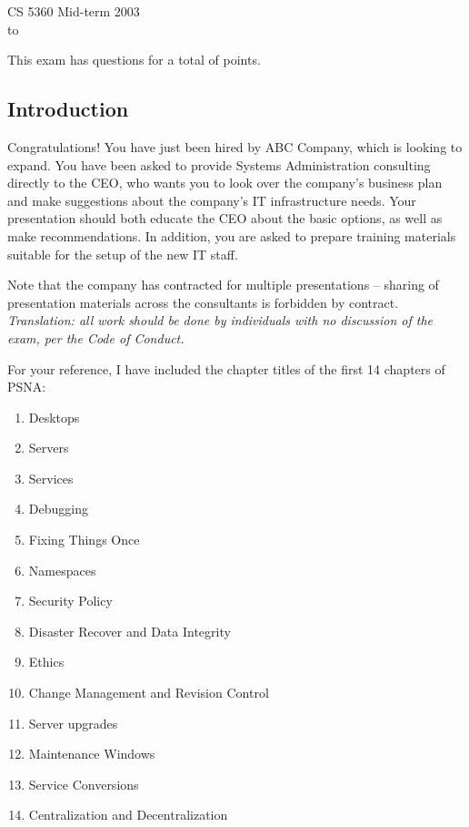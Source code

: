 \documentclass{exam}
\begin{document}
{\large CS 5360 Mid-term 2003}\\
\hbox to \textwidth{\large Name:\enspace\hrulefill}
\vspace{0.1in}

This exam has \numquestions{} questions for a total of \numpoints{} points.

\begin{questions}

\question[100]

\section*{Introduction}

Congratulations!  You have just been hired by ABC Company, which is looking
to expand.  You have been asked to provide Systems Administration
consulting directly to the CEO, who wants you to look over the company's
business plan and make suggestions about the company's IT infrastructure
needs.  Your presentation should both educate the CEO about the basic
options, as well as make recommendations.  In addition, you are asked 
to prepare training materials
suitable for the setup of the new IT staff.

Note that the company has contracted for multiple presentations -- sharing
of presentation materials across the consultants is forbidden by contract.
\emph{Translation: all work should be done by individuals with no discussion
of the exam, per the Code of Conduct.}

For your reference, I have included the chapter titles of the first
14 chapters of PSNA:

\begin{enumerate}
\item Desktops
\item Servers
\item Services
\item Debugging
\item Fixing Things Once
\item Namespaces
\item Security Policy
\item Disaster Recover and Data Integrity
\item Ethics
\item Change Management and Revision Control
\item Server upgrades
\item Maintenance Windows
\item Service Conversions
\item Centralization and Decentralization
\end{enumerate}


\end{questions}
\end{document}
